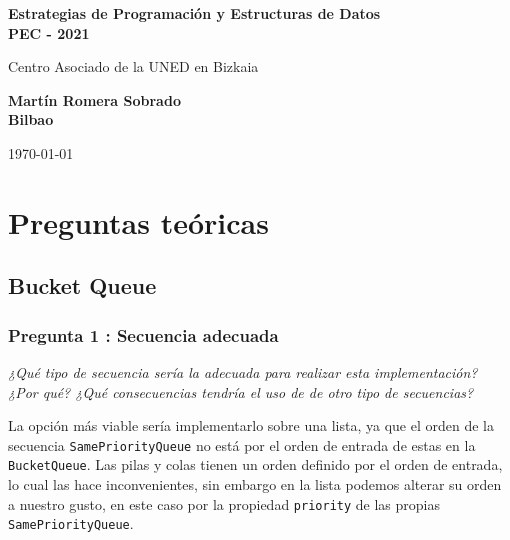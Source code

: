 \documentclass[a4paper, 12pt]{article}
\begin{document}
    
    \begin{titlepage}
        
        \centering
		\vspace*{1cm}
		
		\Huge
		\textbf{Estrategias de Programación y Estructuras de Datos}\\
		\textbf{PEC - 2021}
		
		\vspace{0.5cm}
		\LARGE
		Centro Asociado de la UNED en Bizkaia\\
		\vspace{1.5cm}
		
		\textbf{Martín Romera Sobrado}\\
		\textbf{Bilbao}
		
		\vfill
		
		\vspace{0.8cm}
		\Large
		\today

    \end{titlepage}

    \section{Preguntas teóricas}

        \subsection{Bucket Queue}

            \subsubsection{Pregunta 1 : Secuencia adecuada}

                \textit{¿Qué tipo de secuencia sería la adecuada para realizar 
                esta implementación? ¿Por qué? ¿Qué consecuencias tendría el
                uso de de otro tipo de secuencias?}\\\mbox{}

                La opción más viable sería implementarlo sobre una lista, ya que
                el orden de la secuencia \texttt{SamePriorityQueue} no está 
                por el orden de entrada de estas en la \texttt{BucketQueue}. Las 
                pilas y colas tienen un orden definido por el orden de entrada, 
                lo cual las hace inconvenientes, sin embargo en la lista podemos
                alterar su orden a nuestro gusto, en este caso por la propiedad
                \texttt{priority} de las propias \texttt{SamePriorityQueue}.
            
\end{document}
